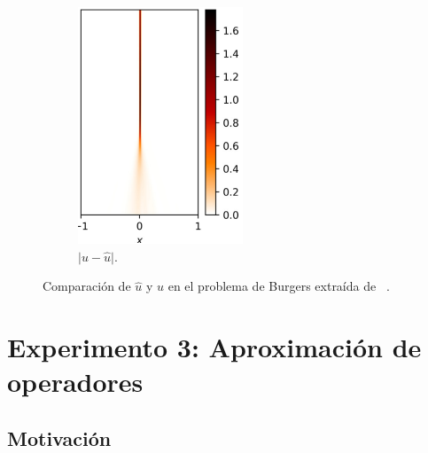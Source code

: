\begin{figure}[htbp]
\begin{subfigure}{0.235\textwidth}
    \includegraphics[width=\linewidth]{img/img88.png}
    \caption{$\vert u- \hat{u}\vert$.}
    \label{fig:img88}
    \end{subfigure}
\caption{Comparación de $\hat{u}$ y $u$  en el problema de Burgers extraída de ~\cite{Haghighat2021}.}
\label{fig:img1029}
\end{figure}



\section{Experimento 3: Aproximación de operadores}
\subsection{Motivación}


